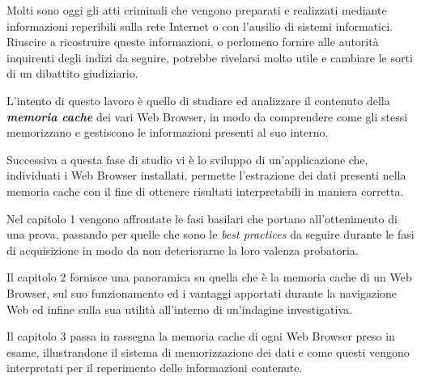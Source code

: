 Molti sono oggi gli atti criminali che vengono preparati e realizzati mediante informazioni reperibili sulla rete Internet o con l'ausilio di sistemi informatici. Riuscire a ricostruire queste informazioni, o perlomeno fornire alle autorità inquirenti degli indizi da seguire, potrebbe rivelarsi molto utile e cambiare le sorti di un dibattito giudiziario.

L'intento di questo lavoro è quello di studiare ed analizzare il contenuto della \textbf{\textit{memoria cache}} dei vari Web Browser, in modo da comprendere come gli stessi memorizzano e gestiscono le informazioni presenti al suo interno. 

Successiva a questa fase di studio vi è lo sviluppo di un'applicazione che, individuati i Web Browser installati, permette l'estrazione dei dati presenti nella memoria cache con il fine di ottenere risultati interpretabili in maniera corretta.

Nel capitolo 1 vengono affrontate le fasi basilari che portano all'ottenimento di una prova, passando per quelle che sono le \textit{best practices} da seguire durante le fasi di acquisizione in modo da non deteriorarne la loro valenza probatoria. 

Il capitolo 2 fornisce una panoramica su quella che è la memoria cache di un Web Browser, sul suo funzionamento ed i vantaggi apportati durante la navigazione Web ed infine sulla sua utilità all'interno di un'indagine investigativa. 
\clearpage

Il capitolo 3 passa in rassegna la memoria cache di ogni Web Browser preso in esame, illustrandone il sistema di memorizzazione dei dati e come questi vengono interpretati per il reperimento delle informazioni contenute.